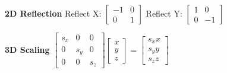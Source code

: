 \documentclass[letterpaper, 8pt]{extarticle}
\begin{document}
\begin{multicols*}{4}
    \textbf{2D Reflection}
    Reflect X:\@
    \(
    \begin{bmatrix} -1 & 0 \\ 0 & 1 \end{bmatrix}
    \)
    Reflect Y:\@
    \(
    \begin{bmatrix} 1 & 0 \\ 0 & -1 \end{bmatrix}
    \)

    \textbf{3D Scaling}
    \(
    \begin{bmatrix}
        s_x & 0   & 0   \\
        0   & s_y & 0   \\
        0   & 0   & s_z
    \end{bmatrix}
    \begin{bmatrix}
        x \\ y \\ z
    \end{bmatrix}
    =
    \begin{bmatrix}
        s_x x \\ s_y y \\ s_z z
    \end{bmatrix}
    \)





\end{multicols*}
\end{document}
